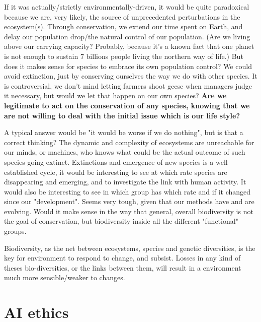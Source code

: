 \documentclass[12pt]{article}
\begin{document}
If it was actually/strictly environmentally-driven, it would be quite paradoxical because we are, very likely, the source of unprecedented perturbations in the ecosystem(s).
Through conservation, we extend our time spent on Earth, and delay our population drop/the natural control of our population. 
(Are we living above our carrying capacity? Probably, because it's a known fact that one planet is not enough to sustain 7 billions people living the northern way of life.)
But does it makes sense for species to embrace its own population control? We could avoid extinction, just by conserving ourselves the way we do with other species.
It is controversial, we don't mind letting farmers shoot geese when managers judge it necessary, but would we let that happen on our own species?
\textbf{Are we legitimate to act on the conservation of any species, knowing that we are not willing to deal with the initial issue which is our life style?}

A typical answer would be "it would be worse if we do nothing", but is that a correct thinking?
The dynamic and complexity of ecosystems are unreachable for our minds, or machines, who knows what could be the actual outcome of such species going extinct.
Extinctions and emergence of new species is a well established cycle, it would be interesting to see at which rate species are disappearing and emerging, and to investigate the link with human activity.
It would also be interesting to see in which group has which rate and if it changed since our "development".
Seems very tough, given that our methods have and are evolving.
Would it make sense in the way that general, overall biodiversity is not the goal of conservation, but biodiversity inside all the different "functional" groups.

Biodiversity, as the net between ecosystems, species and genetic diversities, is the key for environment to respond to change, and subsist. Losses in any kind of theses bio-diversities, or the links between them, will result in a environment much more sensible/weaker to changes.

\section{AI ethics}
\newpage

\nocite{*}
\end{document}
